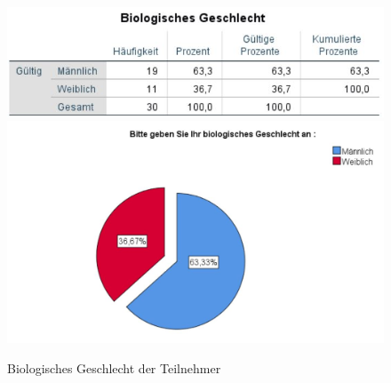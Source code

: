 \documentclass[a4paper,11pt]{article}%
\renewcommand{\\}{\vspace*{0.5\baselineskip} \newline}
\begin{document}
	\begin{figure}[H]
		\begin{footnotesize}
			\includegraphics[width=\textwidth]{Abbildungen/Pre_QuestionnaireStatistiks/teilnehmerGeschlecht}\\
			\includegraphics[width=\textwidth]{Abbildungen/Demographie/teilnehmerGeschlecht}\\
			\caption{Biologisches Geschlecht der Teilnehmer}
			\label{fig:biologischesGeschlecht}
		\end{footnotesize}
	\end{figure}	
	
\end{document}
